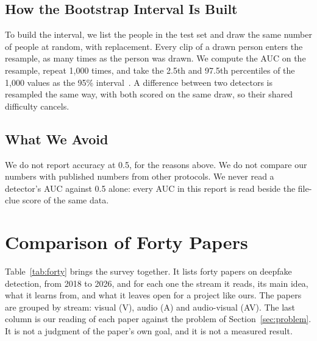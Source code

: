 \subsection{How the Bootstrap Interval Is Built}

To build the interval, we list the people in the test set and draw the same
number of people at random, with replacement. Every clip of a drawn person
enters the resample, as many times as the person was drawn. We compute the AUC
on the resample, repeat 1,000 times, and take the 2.5th and 97.5th
percentiles of the 1,000 values as the 95\% interval~\cite{bootstrap}. A
difference between two detectors is resampled the same way, with both scored
on the same draw, so their shared difficulty cancels.

\subsection{What We Avoid}

We do not report accuracy at 0.5, for the reasons above. We do not compare
our numbers with published numbers from other protocols. We never read a
detector's AUC against 0.5 alone: every AUC in this report is read beside the
file-clue score of the same data.

\section{Comparison of Forty Papers}
\label{sec:l-forty}

Table~\ref{tab:forty} brings the survey together. It lists forty papers on
deepfake detection, from 2018 to 2026, and for each one the stream it reads,
its main idea, what it learns from, and what it leaves open for a project like
ours. The papers are grouped by stream: visual (V), audio (A) and audio-visual
(AV). The last column is our reading of each paper against the problem of
Section~\ref{sec:problem}. It is not a judgment of the paper's own goal, and
it is not a measured result.

